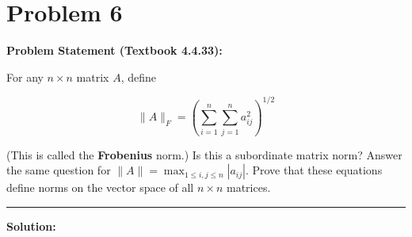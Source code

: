 \clearpage
\section*{Problem 6}

\textbf{Problem Statement (Textbook 4.4.33):} 

For any $n \times n$ matrix $A$, define

$$\|A\|_F = \left(\sum_{i=1}^{n} \sum_{j=1}^{n} a_{ij}^2\right)^{1/2}$$

(This is called the \textbf{Frobenius} norm.) Is this a subordinate matrix norm? Answer the same question for $\|A\| = \max_{1 \leq i,j \leq n} |a_{ij}|$. Prove that these equations define norms on the vector space of all $n \times n$ matrices.

\noindent\rule{\textwidth}{0.4pt}

\vspace{1em}

\textbf{Solution:}

